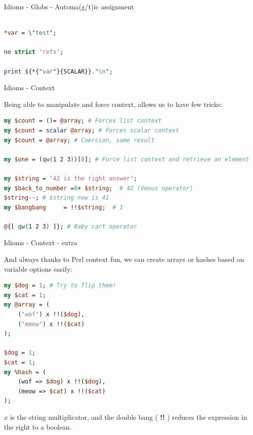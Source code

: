 \documentclass[10pt]{beamer}
\begin{document}
\begin{frame}[fragile]{Idioms - Globs - Automa(g/t)ic assignment }

\begin{lstlisting}[language=perl]

*var = \"test";

no strict 'refs';

print ${*{"var"}{SCALAR}}."\n";

\end{lstlisting}
\pause



\end{frame}

\begin{frame}[fragile]{Idioms - Context}

Being able to manipulate and force context, allows us to have few tricks:
\begin{lstlisting}[language=perl]
my $count = ()= @array; # Forces list context
my $count = scalar @array; # Forces scalar context
my $count = @array; # Coercion, same result

my $one = (qw(1 2 3))[0]; # Force list context and retrieve an element in array

my $string = '42 is the right answer';
my $back_to_number =0+ $string;  # 42 (Venus operator)
$string--; # $string now is 41
my $bangbang     = !!$string;  # 1

@{[ qw(1 2 3) ]}; # Baby cart operator
\end{lstlisting}

\end{frame}

\begin{frame}[fragile]{Idioms - Context - extra }

And always thanks to Perl context fun, we can create arrays or hashes based on variable options easily:

\begin{lstlisting}[language=perl]
my $dog = 1; # Try to flip them!
my $cat = 1;
my @array = (
    ('wof') x !!($dog),
    ('meow') x !!($cat)
);

$dog = 1;
$cat = 1;
my %hash = (
    (wof => $dog) x !!($dog),
    (meow => $cat) x !!($cat)
);

\end{lstlisting}

$x$ is the string multiplicator, and the double bang ( \textbf{!!} ) reduces the expression in the right to a boolean.

\end{frame}
\end{document}

